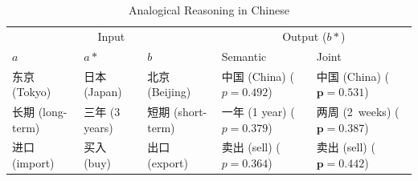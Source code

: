 \begin{table}[h!]
    \centering
    \begin{CJK}{UTF8}{gbsn}
        \begin{tabularx}{\textwidth}{lllbb}
            \toprule
            \multicolumn{3}{c}{Input} & \multicolumn{2}{c}{Output ($b*$)} \\
            \cmidrule(lr){1-3} \cmidrule(lr){4-5} $a$ & $a*$ & $b$ & Semantic & Joint \\\midrule
            \vspace{0.2cm} 东京 (Tokyo) & 日本 (Japan) & 北京 (Beijing) & 中国 (China) \newline ($p=0.492$) & 中国 (China) \newline ($\bm{p=0.531}$) \\
            \vspace{0.2cm} 长期 (long-term) & 三年 (3 years) & 短期 (short-term) & 一年 (1 year) \newline ($p=0.379$) & \mbox{两周} (\mbox{2 weeks}) \newline ($\bm{p=0.387}$) \\
            进口 (import) & 买入 (buy) & 出口 (export) & 卖出 (sell) \newline ($p=0.364$) & 卖出 (sell) \newline ($\bm{p=0.442}$)\\\bottomrule
        \end{tabularx}
    \end{CJK}
    \caption{Analogical Reasoning in Chinese}
    \label{tab:analysis_analogy1}
\end{table}

